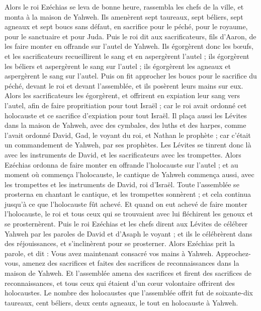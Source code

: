 \begin{multicols}{2}
Alors le roi Ezéchias se leva de bonne heure, rassembla les chefs de la ville, et monta à la maison de Yahweh.
Ils amenèrent sept taureaux, sept béliers, sept agneaux et sept boucs sans défaut, en sacrifice pour le péché, pour le royaume, pour le sanctuaire et pour Juda. Puis le roi dit aux sacrificateurs, fils d'Aaron, de les faire monter en offrande sur l'autel de Yahweh.
Ils égorgèrent donc les bœufs, et les sacrificateurs recueillirent le sang et en aspergèrent l'autel ; ils égorgèrent les béliers et aspergèrent le sang sur l'autel ; ils égorgèrent les agneaux et aspergèrent le sang sur l'autel.
Puis on fit approcher les boucs pour le sacrifice du péché, devant le roi et devant l'assemblée, et ils posèrent leurs mains sur eux.
Alors les sacrificateurs les égorgèrent, et offrirent en expiation leur sang vers l'autel, afin de faire propritiation pour tout Israël ; car le roi avait ordonné cet holocauste et ce sacrifice d'expiation pour tout Israël.
Il plaça aussi les Lévites dans la maison de Yahweh, avec des cymbales, des luths et des harpes, comme l’avait ordonné David, Gad, le voyant du roi, et Nathan le prophète ; car c'était un commandement de Yahweh, par ses prophètes.
Les Lévites se tinrent donc là avec les instruments de David, et les sacrificateurs avec les trompettes.
Alors Ezéchias ordonna de faire monter en offrande l'holocauste sur l'autel ; et au moment où commença l'holocauste, le cantique de Yahweh commença aussi, avec les trompettes et les instruments de David, roi d'Israël.
Toute l'assemblée se prosterna en chantant le cantique, et les trompettes sonnèrent ; et cela continua jusqu'à ce que l'holocauste fût achevé.
Et quand on eut achevé de faire monter l'holocauste, le roi et tous ceux qui se trouvaient avec lui fléchirent les genoux et se prosternèrent.
Puis le roi Ezéchias et les chefs dirent aux Lévites de célébrer Yahweh par les paroles de David et d'Asaph le voyant ; et ils le célébrèrent dans des réjouissances, et s'inclinèrent pour se prosterner.
Alors Ezéchias prit la parole, et dit : Vous avez maintenant consacré vos mains à Yahweh. Approchez-vous, amenez des sacrifices et faites des sacrifices de reconnaissances dans la maison de Yahweh. Et l'assemblée amena des sacrifices et firent des sacrifices de reconnaissances, et tous ceux qui étaient d'un cœur volontaire offrirent des holocaustes.
Le nombre des holocaustes que l'assemblée offrit fut de soixante-dix taureaux, cent béliers, deux cents agneaux, le tout en holocauste à Yahweh.

\end{multicols}
